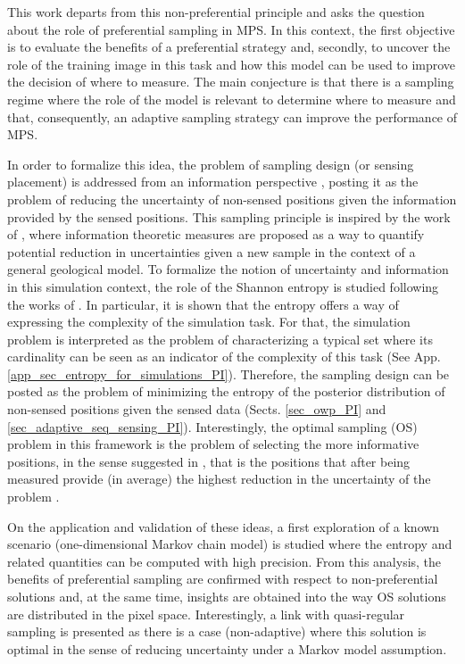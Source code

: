 This work departs from this non-preferential principle and asks the question about the role of preferential sampling in MPS. In this context, the first objective is to evaluate the benefits of a preferential strategy and, secondly, to uncover  the role of the training image in this task and how this model can be used to improve the decision of where to measure. The main conjecture is that there is a sampling regime where the role of the model is relevant to determine where to measure and that, consequently, an adaptive sampling strategy can improve the performance of MPS. 

In order to formalize this idea, the problem of sampling design (or sensing placement) is addressed from an information perspective \citep{MacKay_2002a,cover_2006}, posting it as the problem of reducing the uncertainty of non-sensed positions given the information provided by the sensed positions.  {This sampling principle is inspired by the work of \cite{wellman_2013}, where information theoretic measures are proposed as a way to quantify potential reduction in uncertainties given a new sample in the context of a general geological model}.  To formalize the notion of uncertainty and information in this simulation context, the role of the { Shannon entropy} is studied {following the works of \cite{wellman_2013,wellman_2012a}}. In particular, it is shown that the entropy offers a way of expressing the complexity of the simulation task. For that, the simulation problem is interpreted as the problem of characterizing a typical set where its cardinality can be seen as an indicator of the complexity of this task (See App. \ref{app_sec_entropy_for_simulations_PI}).  Therefore, the sampling design can be posted as the problem of minimizing the entropy of the posterior distribution of non-sensed positions given the sensed data (Sects. \ref{sec_owp_PI} and \ref{sec_adaptive_seq_sensing_PI}). Interestingly, the optimal sampling (OS) problem in this framework is the problem of selecting the more informative positions, {in the sense suggested in \citep[Sec.4]{wellman_2013}}, that is the positions that after being measured  provide {(in average)} the highest reduction in the uncertainty of the problem \citep{cover_2006}.

On the application and validation of these ideas, a first exploration of a known scenario (one-dimensional Markov chain model) is studied where the entropy and related quantities can be computed with high precision. From this analysis, the benefits of preferential sampling are confirmed with respect to non-preferential solutions and, at the same time, insights are obtained into the way OS solutions are distributed in the pixel space. Interestingly, a link with quasi-regular sampling is presented as there is a case (non-adaptive) where this solution is optimal in the sense of reducing uncertainty under a Markov model assumption. 

